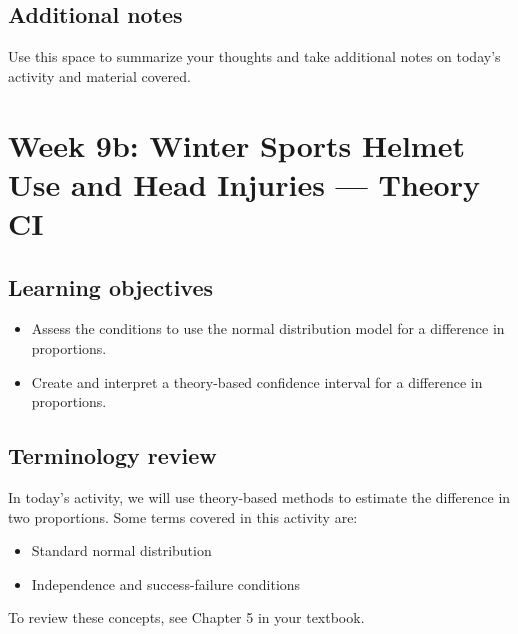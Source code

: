 \documentclass[
]{report}
\begin{document}
\hypertarget{additional-notes-13}{%
\subsection{Additional notes}\label{additional-notes-13}}

Use this space to summarize your thoughts and take additional notes on today's activity and material covered.

\newpage

\hypertarget{week-9b-winter-sports-helmet-use-and-head-injuries-theory-ci}{%
\section{Week 9b: Winter Sports Helmet Use and Head Injuries --- Theory CI}\label{week-9b-winter-sports-helmet-use-and-head-injuries-theory-ci}}


\hypertarget{learning-objectives-14}{%
\subsection{Learning objectives}\label{learning-objectives-14}}

\begin{itemize}
\item
  Assess the conditions to use the normal distribution model for a difference in proportions.
\item
  Create and interpret a theory-based confidence interval for a difference in proportions.
\end{itemize}

\hypertarget{terminology-review-15}{%
\subsection{Terminology review}\label{terminology-review-15}}

In today's activity, we will use theory-based methods to estimate the difference in two proportions. Some terms covered in this activity are:

\begin{itemize}
\item
  Standard normal distribution
\item
  Independence and success-failure conditions
\end{itemize}

To review these concepts, see Chapter 5 in your textbook.
\end{document}
